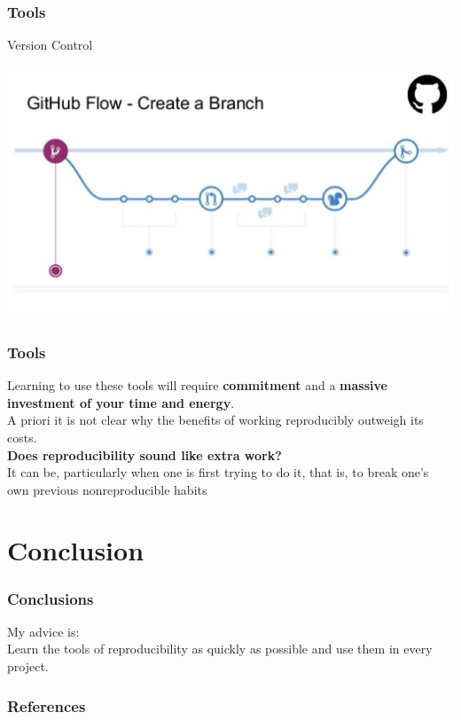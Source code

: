 \documentclass{beamer}
\begin{document}
\begin{frame}
    \frametitle{Tools}
    \begin{center}\Large {\sc Version Control}\end{center}
\begin{center}\includegraphics[scale=0.45]{figures/git.png}\end{center}

\end{frame}
\begin{frame}
\frametitle{Tools}

Learning to use these tools will require \textbf{commitment} and a \textbf{massive investment of your time and energy}.\\ 
A priori it is not clear why the benefits of working reproducibly outweigh its costs.\\

{\bf Does reproducibility sound like extra work?}\\
It can be, particularly when one is first trying to do it, that is, to break one's own previous nonreproducible habits


\end{frame}

\section{Conclusion}

\begin{frame}
\frametitle{Conclusions}

\begin{center}\Huge{\sc My advice is:}\\ \vspace{20pt}
    \Large Learn the tools of reproducibility as quickly as possible and use them in every project.\end{center}
\end{frame}


\begin{frame}
\frametitle{References}
\fontsize{6}{7.2}\selectfont


\end{frame}
\end{document}
